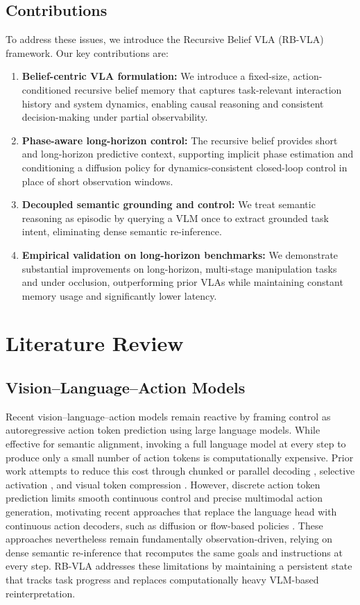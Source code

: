 \documentclass[12pt]{article}
\begin{document}
\subsection{Contributions}
To address these issues, we introduce the Recursive Belief VLA (RB-VLA) framework. Our key contributions are:
\begin{enumerate}
\item \textbf{Belief-centric VLA formulation:} We introduce a fixed-size, action-conditioned recursive belief memory that captures task-relevant interaction history and system dynamics, enabling causal reasoning and consistent decision-making under partial observability.
\item \textbf{Phase-aware long-horizon control:} The recursive belief provides short and long-horizon predictive context, supporting implicit phase estimation and conditioning a diffusion policy for dynamics-consistent closed-loop control in place of short observation windows.
\item \textbf{Decoupled semantic grounding and control:} We treat semantic reasoning as episodic by querying a VLM once to extract grounded task intent, eliminating dense semantic re-inference.
\item \textbf{Empirical validation on long-horizon benchmarks:} We demonstrate substantial improvements on long-horizon, multi-stage manipulation tasks and under occlusion, outperforming prior VLAs while maintaining constant memory usage and significantly lower latency.
\end{enumerate}

\section{Literature Review}

\subsection{Vision--Language--Action Models}
Recent vision--language--action models \cite{kim2024openvla,brohan2022rt} remain reactive by framing control as autoregressive action token prediction using large language models. While effective for semantic alignment, invoking a full language model at every step to produce only a small number of action tokens is computationally expensive. Prior work attempts to reduce this cost through chunked or parallel decoding \cite{kim2025fine,song2025accelerating}, selective activation \cite{yang2025efficientvla}, and visual token compression \cite{vasu2025fastvlm}. However, discrete action token prediction limits smooth continuous control and precise multimodal action generation, motivating recent approaches that replace the language head with continuous action decoders, such as diffusion \cite{bjorck2025gr00t} or flow-based policies \cite{black2025pi_}. These approaches nevertheless remain fundamentally observation-driven, relying on dense semantic re-inference that recomputes the same goals and instructions at every step. RB-VLA addresses these limitations by maintaining a persistent state that tracks task progress and replaces computationally heavy VLM-based reinterpretation.
\end{document}
